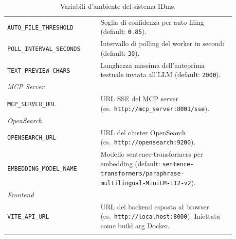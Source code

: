 \begin{longtable}{p{0.38\linewidth} p{0.55\linewidth}}
\texttt{AUTO\_FILE\_THRESHOLD}   & Soglia di confidenza per auto-filing (default: \texttt{0.85}). \\
\texttt{POLL\_INTERVAL\_SECONDS} & Intervallo di polling del worker in secondi (default: \texttt{30}). \\
\texttt{TEXT\_PREVIEW\_CHARS}    & Lunghezza massima dell'anteprima testuale inviata all'LLM (default: \texttt{2000}). \\
\midrule
\multicolumn{2}{l}{\textit{MCP Server}} \\[2pt]
\texttt{MCP\_SERVER\_URL}        & URL SSE del MCP server (es.\ \texttt{http://mcp\_server:8001/sse}). \\
\midrule
\multicolumn{2}{l}{\textit{OpenSearch}} \\[2pt]
\texttt{OPENSEARCH\_URL}         & URL del cluster OpenSearch (es.\ \texttt{http://opensearch:9200}). \\
\texttt{EMBEDDING\_MODEL\_NAME}  & Modello sentence-transformers per embedding (default: \texttt{sentence-transformers/paraphrase-multilingual-MiniLM-L12-v2}). \\
\midrule
\multicolumn{2}{l}{\textit{Frontend}} \\[2pt]
\texttt{VITE\_API\_URL}          & URL del backend esposta al browser (es.\ \texttt{http://localhost:8000}). Iniettata come build arg Docker. \\
\bottomrule
\caption{Variabili d'ambiente del sistema IDms.}
\label{tab:env_vars}
\end{longtable}
